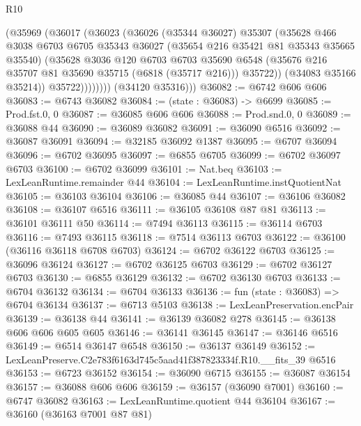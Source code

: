 \begin{lexlean}{R10}
\begin{coremodule}
                  (@35969
                    (@36017
                      (@36023
                        (@36026
                          (@35344 @36027)
                          @35307
                          (@35628
                            @466
                            @3038
                            @6703
                            @6705
                            @35343
                            @36027
                            (@35654 @216 @35421 @81 @35343 @35665 @35540)
                            (@35628
                              @3036
                              @120
                              @6703
                              @6703
                              @35690
                              @6548
                              (@35676 @216 @35707 @81 @35690 @35715 (@6818 (@35717 @216)))
                              @35722))
                          (@34083 @35166 @35214))
                        @35722))))))))
        (@34120 @35316)))
@36082 := @6742 @606 @606
@36083 := @6743 @36082
@36084 := (state : @36083) -> @6699
@36085 := Prod.fst.{0, 0}
@36087 := @36085 @606 @606
@36088 := Prod.snd.{0, 0}
@36089 := @36088 @44
@36090 := @36089 @36082
@36091 := @36090 @6516
@36092 := @36087 @36091
@36094 := @32185 @36092 @1387
@36095 := @6707 @36094
@36096 := @6702 @36095
@36097 := @6855 @6705
@36099 := @6702 @36097 @6703
@36100 := @6702 @36099
@36101 := Nat.beq
@36103 := LexLeanRuntime.remainder @44
@36104 := LexLeanRuntime.instQuotientNat
@36105 := @36103 @36104
@36106 := @36085 @44
@36107 := @36106 @36082
@36108 := @36107 @6516
@36111 := @36105 @36108 @87 @81
@36113 := @36101 @36111 @50
@36114 := @7494 @36113
@36115 := @36114 @6703
@36116 := @7493 @36115
@36118 := @7514 @36113 @6703
@36122 := @36100 (@36116 @36118 @6708 @6703)
@36124 := @6702 @36122 @6703
@36125 := @36096 @36124
@36127 := @6702 @36125 @6703
@36129 := @6702 @36127 @6703
@36130 := @6855 @36129
@36132 := @6702 @36130 @6703
@36133 := @6704 @36132
@36134 := @6704 @36133
@36136 := fun (state : @36083) => @6704 @36134
@36137 := @6713 @5103
@36138 := LexLeanPreservation.encPair
@36139 := @36138 @44
@36141 := @36139 @36082 @278
@36145 := @36138 @606 @606 @605 @605
@36146 := @36141 @36145
@36147 := @36146 @6516
@36149 := @6514 @36147 @6548
@36150 := @36137 @36149
@36152 := LexLeanPreserve.C2e783f6163d745c5aad41f387823334f.R10.__fits_39 @6516
@36153 := @6723 @36152
@36154 := @36090 @6715
@36155 := @36087 @36154
@36157 := @36088 @606 @606
@36159 := @36157 (@36090 @7001)
@36160 := @6747 @36082
@36163 := LexLeanRuntime.quotient @44 @36104
@36167 := @36160 (@36163 @7001 @87 @81)

\end{coremodule}
\end{lexlean}

